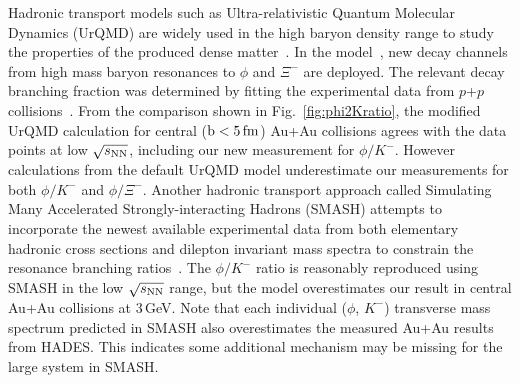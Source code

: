 \documentclass[%
 reprint,	
showpacs,
 amsmath,amssymb,
 aps,
 prc,
]{revtex4-1}
\begin{document}
    

Hadronic transport models such as Ultra-relativistic Quantum Molecular Dynamics (UrQMD) are widely used in the high baryon density range to study the properties of the produced dense matter~\cite{urQMD,UrQMD_2}. In the model~\cite{Steinheimer_2015_UrQMD}, new decay channels from high mass baryon resonances to $\phi$ and $\Xi^-$ are deployed. The relevant decay branching fraction was determined by fitting the experimental data from $p$+$p$ collisions~\cite{ANKE_phi}. From the comparison shown in Fig.~\ref{fig:phi2Kratio}, the modified UrQMD calculation for central ($\rm{b}<5\,\rm{fm}$) Au+Au collisions agrees with the data points at low ${\sqrt{s_{\rm NN}}}$, including our new measurement for $\phi/K^-$.
However calculations from the default UrQMD model underestimate our measurements for both $\phi/K^-$ and $\phi/\Xi^-$.   
Another hadronic transport approach called Simulating Many Accelerated Strongly-interacting Hadrons (SMASH) attempts to incorporate the newest available experimental data from both elementary hadronic cross sections and dilepton invariant mass spectra to constrain the resonance branching ratios~\cite{Elfner_SMASH}. The $\phi/K^-$ ratio is reasonably reproduced using SMASH in the low ${\sqrt{s_{\rm NN}}}$ range, but the model overestimates our result in central Au+Au collisions at 3\,GeV. Note that each individual ($\phi$, $K^-$) transverse mass spectrum predicted in SMASH also overestimates the measured Au+Au results from HADES.
This indicates some additional mechanism may be missing for the large system in SMASH.
\end{document}
